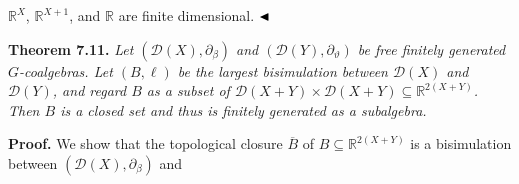 \documentclass[11pt,a4paper]{amsart}
\begin{document}
\hypertarget{html:S7.SS0.SSS0.P0.SPx6.p1.m1}{}\({\mathbb{R}^{X}}\), %
\hypertarget{html:S7.SS0.SSS0.P0.SPx6.p1.m2}{}\({\mathbb{R}^{X+1}}\), and %
\hypertarget{html:S7.SS0.SSS0.P0.SPx6.p1.m3}{}\({\mathbb{R}}\) are finite dimensional. %
\hypertarget{html:S7.SS0.SSS0.P0.SPx6.p1.m4}{}\({\hfill\blacktriangleleft}\)
\par\medskip
\hypertarget{html:S7.Thmtheorem11}{} \par\noindent\textbf{\textbf{Theorem 7.11}\textbf{.}}\quad  %
\hypertarget{html:S7.Thmtheorem11.p1}{} \emph{Let %
\hypertarget{html:S7.Thmtheorem11.p1.m1}{}\({({\mathcal{D}}(X),\partial_{\beta})}\) and %
\hypertarget{html:S7.Thmtheorem11.p1.m2}{}\({({\mathcal{D}}(Y),\partial_{\vartheta})}\) be free finitely generated %
\hypertarget{html:S7.Thmtheorem11.p1.m3}{}\({G}\)-coalgebras. Let %
\hypertarget{html:S7.Thmtheorem11.p1.m4}{}\({(B,\ell)}\) be the largest bisimulation between %
\hypertarget{html:S7.Thmtheorem11.p1.m5}{}\({{\mathcal{D}}(X)}\) and %
\hypertarget{html:S7.Thmtheorem11.p1.m6}{}\({{\mathcal{D}}(Y)}\), and regard %
\hypertarget{html:S7.Thmtheorem11.p1.m7}{}\({B}\) as a subset of %
\hypertarget{html:S7.Thmtheorem11.p1.m8}{}\({{\mathcal{D}}(X+Y)\times{\mathcal{D}}(X+Y)\subseteq\mathbb{R}^{2(X+Y)}}\). Then %
\hypertarget{html:S7.Thmtheorem11.p1.m9}{}\({B}\) is a closed set and thus is finitely generated as a subalgebra.}
\par\medskip
\hypertarget{html:S7.SS0.SSS0.P0.SPx7}{} \par\noindent\textbf{Proof.}\quad  %
\hypertarget{html:S7.SS0.SSS0.P0.SPx7.p1}{} We show that the topological closure %
\hypertarget{html:S7.SS0.SSS0.P0.SPx7.p1.m1}{}\({\overline{B}}\) of %
\hypertarget{html:S7.SS0.SSS0.P0.SPx7.p1.m2}{}\({B\subseteq\mathbb{R}^{2(X+Y)}}\) is a bisimulation between %
\hypertarget{html:S7.SS0.SSS0.P0.SPx7.p1.m3}{}\({({\mathcal{D}}(X),\partial_{\beta})}\) and %
\end{document}
